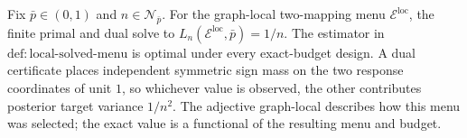 Fix \(\bar p\in(0,1)\) and \(n\in\mathcal N_{\bar p}\). For the graph-local two-mapping menu \(\mathcal E^{\mathrm{loc}}\), the finite primal and dual solve to \(L_n(\mathcal E^{\mathrm{loc}},\bar p)=1/n\). The estimator in \(\mathrm{def{:}local\text{-}solved\text{-}menu}\) is optimal under every exact-budget design. A dual certificate places independent symmetric sign mass on the two response coordinates of unit \(1\), so whichever value is observed, the other contributes posterior target variance \(1/n^2\). The adjective graph-local describes how this menu was selected; the exact value is a functional of the resulting menu and budget.